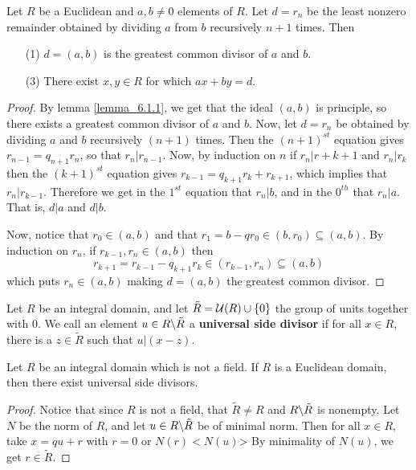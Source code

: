 \begin{theorem}\label{theorem_6.1.6}
  Let $R$ be a Euclidean and $a,b \neq 0$ elements of  $R$. Let  $d=r_n$ be
  the least nonzero remainder obtained by dividing $a$ from $b$ recursively
  $n+1$ times. Then
  \begin{enumerate}
    \item[(1)] $d=(a,b)$ is the greatest common divisor of $a$ and  $b$.

    \item[(3)] There exist $x,y \in R$ for which  $ax+by=d$.
  \end{enumerate}
\end{theorem}
\begin{proof}
  By lemma \ref{lemma_6.1.1}, we get that the ideal $(a,b)$ is principle, so there
  exists a greatest common divisor of $a$ and  $b$. Now, let  $d=r_n$ be
  obtained by dividing $a$ and $b$ recursively $(n+1)$ times. Then the
  $(n+1)^{st}$ equation gives $r_{n-1}=q_{n+1}r_n$, so that $r_n|r_{n-1}$.
  Now, by induction on $n$ if  $r_n|r+{k+1}$ and $r_n|r_k$ then the
  $(k+1)^{st}$ equation gives $r_{k-1}=q_{k+1}r_k+r_{k+1}$, which implies that
  $r_n|r_{k-1}$. Therefore we get in the $1^{st}$ equation that $r_n|b$, and in
  the $0^{th}$ that $r_n|a$. That is,  $d|a$ and  $d|b$.

  Now, notice that $r_0 \in (a,b)$ and that $r_1=b-qr_0 \in (b,r_0) \subseteq
  (a,b)$. By induction on $r_n$, if  $r_{k-1},r_n \in (a,b)$ then
  \begin{equation*}
    r_{k+1}=r_{k-1}-q_{k+1}r_k \in (r_{k-1},r_n) \subseteq (a,b)
  \end{equation*}
  which puts $r_n \in (a,b)$ making $d=(a,b)$ the greatest common divisor.
\end{proof}

\begin{definition}
  Let $R$ be an integral domain, and let
  $\tilde{R}=\mathcal{U}{(R)} \cup \{0\}$ the group of units together with $0$.
  We call an element  $u \in R \backslash \tilde{R}$ a \textbf{universal side
  divisor} if for all $x \in R$, there is a  $z \in \tilde{R}$ such that
  $u|(x-z)$.
\end{definition}

\begin{lemma}\label{lemma_6.1.7}
  Let $R$ be an integral domain which is not a field. If $R$ is a Euclidean
  domain, then there exist universal side divisors.
\end{lemma}
\begin{proof}
  Notice that since $R$ is not a field, that $\tilde{R} \neq R$ and
  $R \backslash \tilde{R}$ is nonempty. Let $N$ be the norm of  $R$, and let  $u
  \in R \backslash \tilde{R}$ be of minimal norm. Then for all $x \in R$, take
  $x=qu+r$ with  $r=0$ or  $N(r)<N(u)$> By minimality of $N(u)$, we get $r \in
  \tilde{R}$.
\end{proof}

